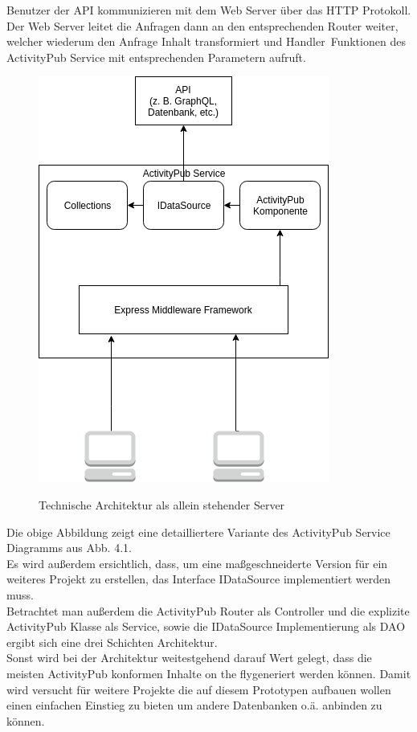 	Benutzer der API kommunizieren mit dem Web Server über das HTTP Protokoll. Der Web Server leitet die Anfragen dann an den entsprechenden Router weiter, welcher wiederum den Anfrage Inhalt transformiert und \glqq Handler\grqq~Funktionen des ActivityPub Service mit entsprechenden Parametern aufruft.
	\begin{figure}[h]
		\begin{minipage}{\textwidth}
			\centering
			\includegraphics[scale=0.6]{figures/Technische-Architektur-standalone.png}
			\label{technische-architektur-standalone}
			\caption{Technische Architektur als allein stehender Server}
		\end{minipage}
	\end{figure}
	Die obige Abbildung zeigt eine detailliertere Variante des ActivityPub Service Diagramms aus Abb. 4.1.\\
	
	Es wird außerdem ersichtlich, dass, um eine maßgeschneiderte Version für ein weiteres Projekt zu erstellen, das Interface IDataSource implementiert werden muss.\\ 
	
	Betrachtet man außerdem die ActivityPub Router als Controller und die explizite ActivityPub Klasse als Service, sowie die IDataSource Implementierung als DAO ergibt sich eine drei Schichten Architektur.\\
	
	Sonst wird bei der Architektur weitestgehend darauf Wert gelegt, dass die meisten ActivityPub konformen Inhalte \glqq on the fly\grqq generiert werden können. Damit wird versucht für weitere Projekte die auf diesem Prototypen aufbauen wollen einen einfachen Einstieg zu bieten um andere Datenbanken o.ä. anbinden zu können.\\